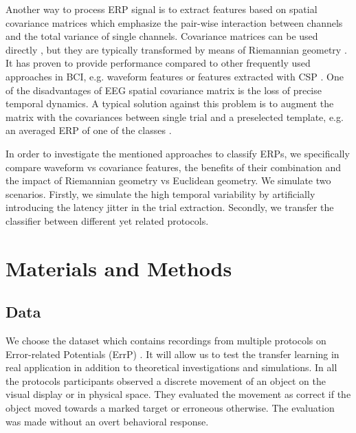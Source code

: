 \documentclass[12pt]{iopart}
\begin{document}
Another way to process ERP signal is to extract features based on spatial covariance matrices
which emphasize the pair-wise interaction
between channels and the total variance of single channels.
Covariance matrices can be used directly \cite{tomioka_classifying_2007}, but
they are typically transformed by means of Riemannian geometry 
\cite{barachant_classification_2013, zanini_transfer_2018}.
It has proven to provide performance compared to other frequently used
approaches in BCI, e.g. waveform features or 
features extracted with CSP \cite{blankertz_optimizing_2008}.
One of the disadvantages of
EEG spatial covariance matrix is the loss of precise temporal dynamics.
A typical solution against this problem is to augment the matrix
with the covariances between single trial and a preselected template,
e.g. an averaged ERP of one of the classes \cite{congedo_new_2013,barachant_plug&play_2014}.

In order to investigate the mentioned approaches to classify ERPs,
we specifically compare waveform vs covariance features,
the benefits of their combination
and the impact of Riemannian geometry vs Euclidean geometry.
We simulate two scenarios. Firstly, we simulate the high temporal
variability by artificially introducing the latency jitter in the 
trial extraction. Secondly, we transfer the classifier between
different yet related protocols.







\section{Materials and Methods}
\label{sec:methods}
\subsection{Data}
We choose the dataset which contains recordings from multiple protocols
on Error-related Potentials (ErrP) \cite{iturrate_latency_2014-1}. It will allow us to test
the transfer learning in real application in addition to theoretical
investigations and simulations.
In all the protocols participants observed a discrete movement of an object
on the visual display or in physical space.
They evaluated the movement as correct if the object moved towards a marked target or erroneous 
otherwise. The evaluation was made without an overt behavioral response.
\end{document}
